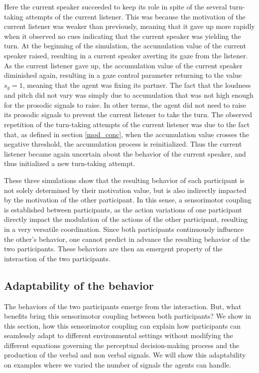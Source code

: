 Here the current speaker succeeded to keep its role in spite of the several turn-taking attempts of the current listener. This was because the motivation of the current listener was weaker than previously, meaning that it gave up more rapidly when it observed no cues indicating that the current speaker was yielding the turn. At the beginning of the simulation, the accumulation value of the current speaker raised, resulting in a current speaker averting its gaze from the listener. As the current listener gave up, the accumulation value of the current speaker diminished again, resulting in a gaze control parameter returning to the value $s_g=1$, meaning that the agent was fixing its partner. The fact that the loudness and pitch did not vary was simply due to accumulation that was not high enough for the prosodic signals to raise. In other terms, the agent did not need to raise its prosodic signals to prevent the current listener to take the turn. The observed repetition of the turn-taking attempts of the current listener was due to the fact that, as defined in section \ref{mod_conc}, when the accumulation value crosses the negative threshold, the accumulation process is reinitialized. Thus the current listener became again uncertain about the behavior of the current speaker, and thus initialized a new turn-taking attempt. 


These three simulations show that the resulting behavior of each participant is not solely determined by their motivation value, but is also indirectly impacted by the motivation of the other participant. In this sense, a sensorimotor coupling is established between participants, as the action variations of one participant directly impact the modulation of the actions of the other participant, resulting in a very versatile coordination. Since both participants continuously influence the other's behavior, one cannot predict in advance the resulting behavior of the two participants. These behaviors are then an emergent property of the interaction of the two participants. 

\subsection{Adaptability of the behavior}

The behaviors of the two participants emerge from the interaction. But, what benefits bring this sensorimotor coupling between both participants?
We show in this section, how this sensorimotor coupling can explain how participants can seamlessly adapt to different environmental settings without modifying the different equations governing the perceptual decision-making process and the production of the verbal and non verbal signals. We will show this adaptability on examples where we varied the number of signals the agents can handle. 

